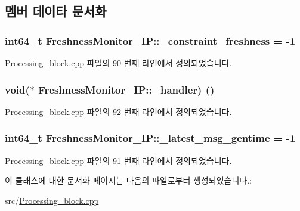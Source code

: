 \subsection{멤버 데이타 문서화}
\subsubsection[{\texorpdfstring{\+\_\+constraint\+\_\+freshness}{_constraint_freshness}}]{\setlength{\rightskip}{0pt plus 5cm}int64\+\_\+t Freshness\+Monitor\+\_\+\+I\+P\+::\+\_\+constraint\+\_\+freshness = -\/1\hspace{0.3cm}{\ttfamily [private]}}\hypertarget{classFreshnessMonitor__IP_ab8e71388a97033da7a0b883bf8f59d44}{}\label{classFreshnessMonitor__IP_ab8e71388a97033da7a0b883bf8f59d44}


Processing\+\_\+block.\+cpp 파일의 90 번째 라인에서 정의되었습니다.

\subsubsection[{\texorpdfstring{\+\_\+handler}{_handler}}]{\setlength{\rightskip}{0pt plus 5cm}void($\ast$ Freshness\+Monitor\+\_\+\+I\+P\+::\+\_\+handler) ()\hspace{0.3cm}{\ttfamily [private]}}\hypertarget{classFreshnessMonitor__IP_a299e67c2c338b3c576c712d0f10fc2f3}{}\label{classFreshnessMonitor__IP_a299e67c2c338b3c576c712d0f10fc2f3}


Processing\+\_\+block.\+cpp 파일의 92 번째 라인에서 정의되었습니다.

\subsubsection[{\texorpdfstring{\+\_\+latest\+\_\+msg\+\_\+gentime}{_latest_msg_gentime}}]{\setlength{\rightskip}{0pt plus 5cm}int64\+\_\+t Freshness\+Monitor\+\_\+\+I\+P\+::\+\_\+latest\+\_\+msg\+\_\+gentime = -\/1\hspace{0.3cm}{\ttfamily [private]}}\hypertarget{classFreshnessMonitor__IP_afb42e4e2c6e1ecc9c40095b513f2147a}{}\label{classFreshnessMonitor__IP_afb42e4e2c6e1ecc9c40095b513f2147a}


Processing\+\_\+block.\+cpp 파일의 91 번째 라인에서 정의되었습니다.



이 클래스에 대한 문서화 페이지는 다음의 파일로부터 생성되었습니다.\+:\begin{DoxyCompactItemize}
\item 
src/\hyperlink{Processing__block_8cpp}{Processing\+\_\+block.\+cpp}\end{DoxyCompactItemize}
